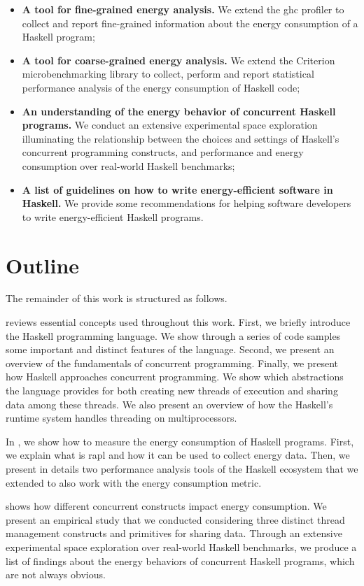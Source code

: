 \begin{itemize}
  \item \textbf{A tool for fine-grained energy analysis.} We extend the \acs{ghc} profiler to collect and report fine-grained information about the energy consumption of a Haskell program;
  \item \textbf{A tool for coarse-grained energy analysis.} We extend the Criterion microbenchmarking library to collect, perform and report statistical performance analysis of the energy consumption of Haskell code;
  \item \textbf{An understanding of the energy behavior of concurrent Haskell programs.} We conduct an extensive experimental space exploration illuminating the relationship between the choices and settings of Haskell's concurrent programming constructs, and performance and energy consumption over real-world Haskell benchmarks;
  \item \textbf{A list of guidelines on how to write energy-efficient software in Haskell.} We provide some recommendations for helping software developers to write energy-efficient Haskell programs.
\end{itemize}

\section{Outline}
The remainder of this work is structured as follows.

\textbf{} reviews essential concepts used throughout this work. First, we briefly introduce the Haskell programming language. We show through a series of code samples some important and distinct features of the language. Second, we present an overview of the fundamentals of concurrent programming. Finally, we present how Haskell approaches concurrent programming. We show which abstractions the language provides for both creating new threads of execution and sharing data among these threads. We also present an overview of how the Haskell's runtime system handles threading on multiprocessors.

In \textbf{}, we show how to measure the energy consumption of Haskell programs. First, we explain what is \acs{rapl} and how it can be used to collect energy data. Then, we present in details two performance analysis tools of the Haskell ecosystem that we extended to also work with the energy consumption metric.

\textbf{} shows how different concurrent constructs impact energy consumption. We present an empirical study that we conducted considering three distinct thread management constructs and primitives for sharing data. Through an extensive experimental space exploration over real-world Haskell benchmarks, we produce a list of findings about the energy behaviors of concurrent Haskell programs, which are not always obvious.

